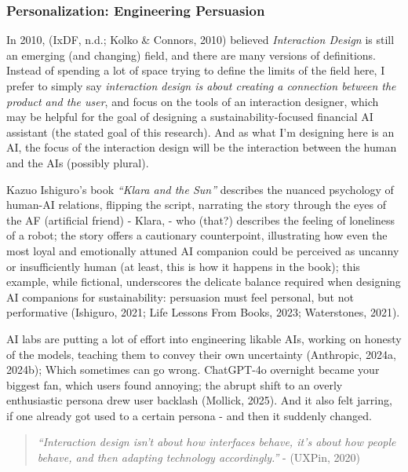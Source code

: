\documentclass[
  12pt,
  letterpaper,
  DIV=11,
  numbers=noendperiod]{scrartcl}
\begin{document}
\subsubsection{Personalization: Engineering
Persuasion}\label{personalization-engineering-persuasion}

In 2010, (IxDF, n.d.; Kolko \& Connors, 2010) believed \emph{Interaction
Design} is still an emerging (and changing) field, and there are many
versions of definitions. Instead of spending a lot of space trying to
define the limits of the field here, I prefer to simply say
\emph{interaction design is about creating a connection between the
product and the user}, and focus on the tools of an interaction
designer, which may be helpful for the goal of designing a
sustainability-focused financial AI assistant (the stated goal of this
research). And as what I'm designing here is an AI, the focus of the
interaction design will be the interaction between the human and the AIs
(possibly plural).

Kazuo Ishiguro's book \emph{``Klara and the Sun''} describes the nuanced
psychology of human-AI relations, flipping the script, narrating the
story through the eyes of the AF (artificial friend) - Klara, - who
(that?) describes the feeling of loneliness of a robot; the story offers
a cautionary counterpoint, illustrating how even the most loyal and
emotionally attuned AI companion could be perceived as uncanny or
insufficiently human (at least, this is how it happens in the book);
this example, while fictional, underscores the delicate balance required
when designing AI companions for sustainability: persuasion must feel
personal, but not performative (Ishiguro, 2021; Life Lessons From Books,
2023; Waterstones, 2021).

AI labs are putting a lot of effort into engineering likable AIs,
working on honesty of the models, teaching them to convey their own
uncertainty (Anthropic, 2024a, 2024b); Which sometimes can go wrong.
ChatGPT-4o overnight became your biggest fan, which users found
annoying; the abrupt shift to an overly enthusiastic persona drew user
backlash (Mollick, 2025). And it also felt jarring, if one already got
used to a certain persona - and then it suddenly changed.

\begin{quote}
\emph{``Interaction design isn't about how interfaces behave, it's about
how people behave, and then adapting technology accordingly.''} -
(UXPin, 2020)
\end{quote}
\end{document}
